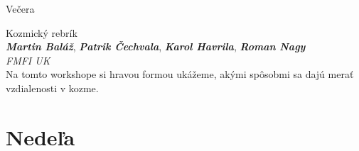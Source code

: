 \documentclass[a4paper]{report}
\begin{document}
                    \begin{tcolorbox}[
                                    colback=red!10,
                    colframe=red!50!black,
                                fonttitle=\Large\bfseries,
                title=19:00
            ]
                {\Large Večera}
                                                            \end{tcolorbox}
                    \begin{tcolorbox}[
                                    colback=blue!10,
                    colframe=black!50!blue,
                                fonttitle=\Large\bfseries,
                title=20:00
            ]
                {\Large Kozmický rebrík}
                                                            \\ \textit{\textbf{Martin Baláž}}, \textit{\textbf{Patrik Čechvala}}, \textit{\textbf{Karol Havrila}}, \textit{\textbf{Roman Nagy}}                                                    \\ \textit{FMFI UK}                \\[2ex]Na tomto workshope si hravou formou ukážeme, akými spôsobmi sa dajú merať vzdialenosti v kozme.
            \end{tcolorbox}
                    \section{Nedeľa}
\end{document}
